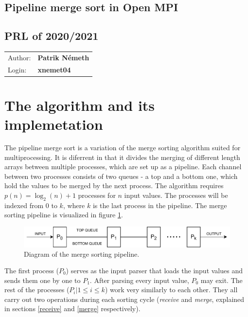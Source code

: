 \documentclass[pdftex, 11pt, a4paper, titlepage]{article}
\begin{document}
    \begin{center}
        \section*{Pipeline merge sort in Open MPI}
        \subsection*{PRL of 2020/2021}
        \begin{tabular}{ l l }
            Author: & \textbf{Patrik Németh} \\
            Login: & \textbf{xnemet04}
        \end{tabular}
    \end{center}
    \section{The algorithm and its implemetation}
        The pipeline merge sort is a variation of the merge sorting algorithm suited for multiprocessing.
        It is diferrent in that it divides the merging of different length arrays between multiple processes,
        which are set up as a pipeline. Each channel between two processes consists of two queues - a top and a bottom
        one, which hold the values to be merged by the next process. The algorithm requires $p(n) = \log_{2}(n)+1$ processes
        for $n$ input values. The processes will be indexed from $0$ to $k$, where $k$ is the last process in the pipeline.
        The merge sorting pipeline is visualized in figure \ref{pms_diagram}.

        \begin{figure}[h]
            \centering
            \includegraphics[scale=0.8]{pms_diagram.pdf}
            \caption{Diagram of the merge sorting pipeline.}
            \label{pms_diagram}
        \end{figure}

        The first process ($P_0$) serves as the input parser that loads the input values and sends them one by
        one to $P_1$. After parsing every input value, $P_0$ may exit. The rest of the processes
        ($P_i | 1\leq{}i\leq{}k$) work very similarly to each other. They all carry out two operations during each sorting cycle
        (\emph{receive} and \emph{merge}, explained in sections \ref{receive} and \ref{merge} respectively).
\end{document}
